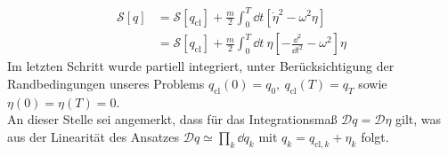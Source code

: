 \begin{align}
\mathcal{S}[q] &= \mathcal{S}[q_{\text{cl}}] + \frac{m}{2}\int_0^T \dd t \left[\dot{\eta}^2 - \omega^2\eta\right] \nonumber \\
&= \mathcal{S}[q_{\text{cl}}] + \frac{m}{2}\int_0^T \dd t \ \eta\left[-\frac{\dd^2}{\dd t^2}-\omega^2\right]\eta \label{eqn:ew-problem}
\end{align}
Im letzten Schritt wurde partiell integriert, unter Berücksichtigung der Randbedingungen unseres Problems $q_{\text{cl}}(0) = q_0,\ q_{\text{cl}}(T) = q_T $ sowie 
	$ \eta(0) = \eta(T) = 0$. \\
	
	An dieser Stelle sei angemerkt, dass für das Integrationsmaß $\mathcal{D}q = \mathcal{D}\eta$ gilt, was aus der Linearität des Ansatzes $\mathcal{D}q \simeq \prod_k \dd q_k $ mit $ q_k = q_{\text{cl},k} + \eta_k$ folgt. \\
	
